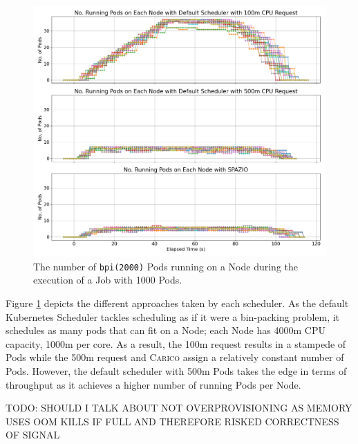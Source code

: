 \begin{figure}[ht!]
    \centering
    \includegraphics[width=\textwidth]{images/pi-running-pods.png}
    \caption{The number of \texttt{bpi(2000)} Pods running on a Node during the
    execution of a Job with 1000 Pods.}
    \label{fig:pi-2000-1000x-pod-running}
\end{figure}
Figure \ref{fig:pi-2000-1000x-pod-running} depicts the different approaches
taken by each scheduler. As the default Kubernetes Scheduler tackles scheduling
as if it were a bin-packing problem, it schedules as many pods that can fit on a
Node; each Node has 4000m CPU capacity, 1000m per core. As a result, the 100m
request results in a stampede of Pods while the 500m request and \textsc{Carico} assign
a relatively constant number of Pods. However, the default scheduler with 500m
Pods takes the edge in terms of throughput as it achieves a higher number of
running Pods per Node.


TODO: SHOULD I TALK ABOUT NOT OVERPROVISIONING AS MEMORY USES OOM KILLS IF FULL
AND THEREFORE RISKED CORRECTNESS OF SIGNAL

